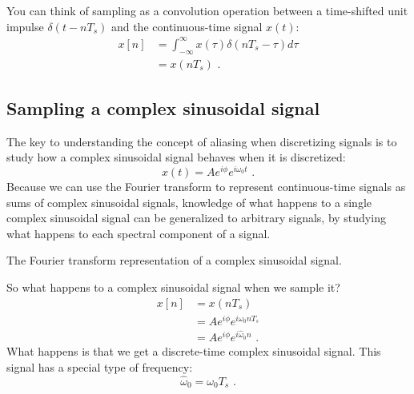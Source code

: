  You can think of sampling as a convolution operation between a
  time-shifted unit impulse $\delta(t-nT_s)$ and the continuous-time
  signal $x(t)$:
  \begin{align}
    x[n] & = \int_{-\infty}^{\infty} x(\tau) \delta(n T_s - \tau)  d\tau \\
         & = x(n T_s)\,\,.
  \end{align}
\fi

\subsection{Sampling a complex sinusoidal signal}

The key to understanding the concept of aliasing when discretizing signals is to study how a complex sinusoidal signal behaves when it is discretized:
\begin{equation}
  x(t)=A e^{i\phi} e^{i\omega_0 t}\,\,.
\end{equation}
Because we can use the Fourier transform to represent continuous-time
signals as sums of complex sinusoidal signals, knowledge of what
happens to a single complex sinusoidal signal can be generalized to
arbitrary signals, by studying what happens to each spectral component
of a signal.

\begin{marginfigure}
  \begin{center}
  \end{center}
  \caption{The Fourier transform representation of a complex sinusoidal signal.}
\end{marginfigure}

So what happens to a complex sinusoidal signal when we sample it?
\begin{align}
  x[n] & =x(nT_s)                                \\
       & =A e^{i\phi} e^{i\omega_0 n T_s }       \\
       & =A e^{i\phi} e^{i\hat{\omega}_0 n}\,\,.
\end{align}
What happens is that we get a discrete-time complex sinusoidal signal. This signal has a special type of frequency:
\begin{equation}
  \boxed{
    \hat{\omega}_0 = \omega_0 T_s
  }\,\,.
\end{equation}

